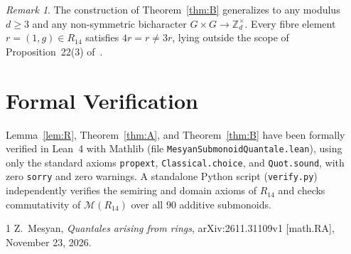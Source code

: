 \documentclass[11pt]{article}
\theoremstyle{remark}
\newtheorem*{remark}{Remark}
\begin{document}
\begin{remark}
The construction of Theorem~\ref{thm:B} generalizes to any modulus $d \ge 3$ and any non-symmetric bicharacter $G \times G \to \mathbb{Z}_d^\times$. Every fibre element $r = (1, g) \in R_{14}$ satisfies $4r = r \ne 3r$, lying outside the scope of Proposition~22(3) of~\cite{Mesyan2026}.
\end{remark}

\section{Formal Verification}
Lemma~\ref{lem:R}, Theorem~\ref{thm:A}, and Theorem~\ref{thm:B} have been formally verified in Lean~4 with Mathlib (file \texttt{Mesyan\-Submonoid\-Quantale.lean}), using only the standard axioms \texttt{propext}, \texttt{Classical.choice}, and \texttt{Quot.sound}, with zero \texttt{sorry} and zero warnings. A standalone Python script (\texttt{verify.py}) independently verifies the semiring and domain axioms of $R_{14}$ and checks commutativity of $\mathcal{M}(R_{14})$ over all $90$ additive submonoids.

\begin{thebibliography}{1}
Z.~Mesyan, \emph{Quantales arising from rings}, arXiv:2611.31109v1 [math.RA], November 23, 2026.
\end{thebibliography}
\end{document}
